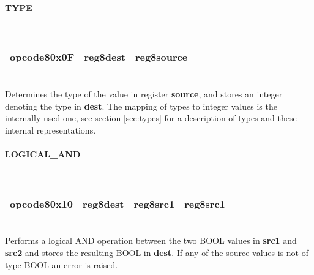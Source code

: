 \documentclass[12pt,a4paper]{article}
\begin{document}
\vspace{2em}\begin{minipage}{\textwidth}
\paragraph{TYPE}
~\vspace{1em}\\\begin{tabular}{|p{2cm}|p{2cm}|p{2cm}|}
\hline
opcode8\newline\textbf{0x0F} & reg8\newline\textbf{dest} & reg8\newline\textbf{source} \\
\hline
\end{tabular}\vspace{1em}\\
Determines the type of the value in register \textbf{source}, and stores an integer
denoting the type in \textbf{dest}. The mapping of types to integer values is
the internally used one, see section \ref{sec:types} for a description of types
and these internal representations. 
\end{minipage}

\vspace{2em}\begin{minipage}{\textwidth}
\paragraph{LOGICAL\_AND}
~\vspace{1em}\\\begin{tabular}{|p{2cm}|p{2cm}|p{2cm}|p{2cm}|}
\hline
opcode8\newline\textbf{0x10} & reg8\newline\textbf{dest} &
reg8\newline\textbf{src1} & reg8\newline\textbf{src1} \\
\hline
\end{tabular}\vspace{1em}\\
Performs a logical AND operation between the two BOOL values in \textbf{src1}
and \textbf{src2} and stores the resulting BOOL in \textbf{dest}. If any of the
source values is not of type BOOL an error is raised.
\end{minipage}
\end{document}
